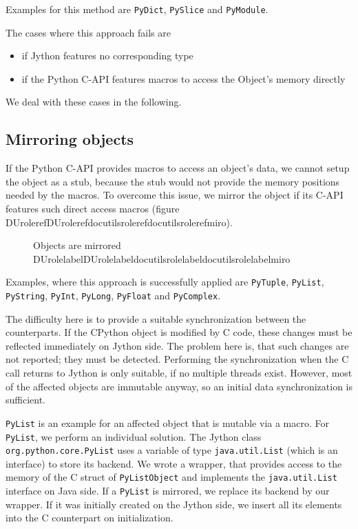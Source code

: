 \documentclass[letterpaper,compsoc,twoside]{IEEEtran}
\providecommand*{\DUrole}[2]{\ifcsname DUrole#1\endcsname \csname DUrole#1\endcsname{#2}\else \ifcsname docutilsrole#1\endcsname \csname docutilsrole#1\endcsname{#2}\else #2\fi \fi }
\begin{document}
Examples for this method are
\texttt{PyDict}, \texttt{PySlice} and \texttt{PyModule}.

The cases where this approach fails are\begin{itemize}

\item 

if Jython features no corresponding type
\item 

if the Python C-API features macros to access the Object's memory directly
\end{itemize}


We deal with these cases in the following.

\subsection{Mirroring objects\label{mirroring-objects}}


If the Python C-API provides macros to access an object's data, we cannot setup
the object as a stub, because the stub would not provide the memory positions needed
by the macros. To overcome this issue, we mirror the object if its C-API features
such direct access macros (figure \DUrole{ref}{miro}).\begin{figure}[]\noindent{}
\caption{Objects are mirrored \DUrole{label}{miro}}
\end{figure}

Examples, where this approach is successfully applied are \texttt{PyTuple}, \texttt{PyList}, \texttt{PyString}, \texttt{PyInt}, \texttt{PyLong}, \texttt{PyFloat} and \texttt{PyComplex}.

The difficulty here is to provide a suitable synchronization between the counterparts.
If the CPython object is modified by C code, these changes must be reflected immediately on Jython side.
The problem here is, that such changes are not reported; they must be detected. Performing the synchronization when the C call returns to Jython is only suitable, if no multiple threads exist.
However, most of the affected objects are immutable anyway, so an initial data synchronization is sufficient.

\texttt{PyList} is an example for an affected object that is mutable via a macro. For \texttt{PyList}, we
perform an individual solution. The Jython class \texttt{org.python.core.PyList} uses a variable of type \texttt{java.util.List} (which is an interface) to store its backend. We wrote a wrapper, that provides access to the memory of the C struct of \texttt{PyListObject} and implements the \texttt{java.util.List} interface on Java side. If a \texttt{PyList} is mirrored, we replace its backend by our wrapper. If it was initially created on the Jython side, we insert all its elements into the C counterpart on initialization.
\end{document}
